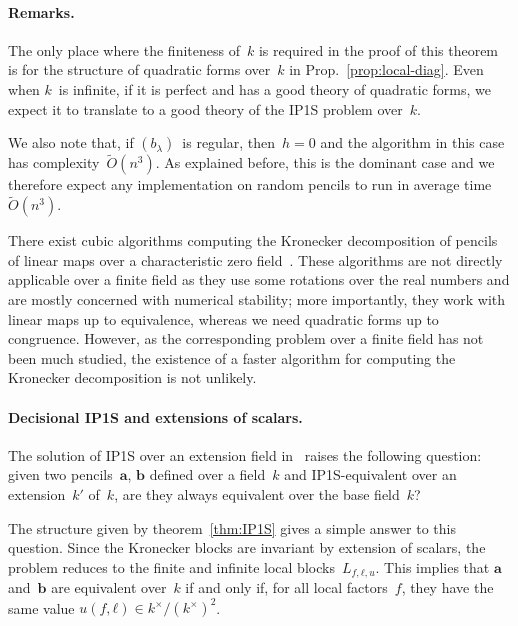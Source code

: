 \documentclass{article}%
\def\Ot{\widetilde{O}}
\begin{document}
\paragraph{Remarks.}

The only place where the finiteness of~$k$ is required in the proof of
this theorem is for the structure of quadratic forms over~$k$ in
Prop.~\ref{prop:local-diag}. Even when $k$~is infinite, if it is perfect
and has a good theory of quadratic forms,
we expect it to translate to a good theory of the IP1S problem over~$k$.

We also note that, if $(b_{λ})$~is regular,
then~$h = 0$ and the algorithm in this case has complexity~$\Ot(n^3)$. As
explained before, this is the dominant case and we therefore expect any
implementation on random pencils to run in average time~$\Ot(n^3)$.

There exist cubic algorithms computing the Kronecker decomposition of pencils of
linear maps over a characteristic zero field~\cite{beelen1988improved}.
These algorithms are not directly applicable over a finite field as they
use some rotations over the real numbers and are mostly concerned with
numerical stability; more importantly, they work with linear maps up to
equivalence, whereas we need quadratic forms up to congruence. However, as the
corresponding problem over a finite field has not been much studied, the
existence of a faster algorithm for computing the Kronecker decomposition is not
unlikely.

\paragraph{Decisional IP1S and extensions of scalars.}

The solution of IP1S over an extension field
in~\cite{DBLP:journals/corr/BerthomieuFP13} raises the following
question: given two pencils~$\bm{a}$, $\bm{b}$ defined over a field~$k$
and IP1S-equivalent over an extension~$k'$ of~$k$, are they always
equivalent over the base field~$k$?

The structure given by theorem~\ref{thm:IP1S} gives a simple answer
to this question. Since the Kronecker blocks are invariant by extension of
scalars, the problem reduces to the finite and infinite local
blocks~$L_{f,ℓ,u}$.
This implies that $\bm{a}$ and~$\bm{b}$ are equivalent over~$k$
if and only if, for all local factors~$f$, they have the same value
$u(f, ℓ) ∈ k^{×}/(k^{×})^2$.
\end{document}
